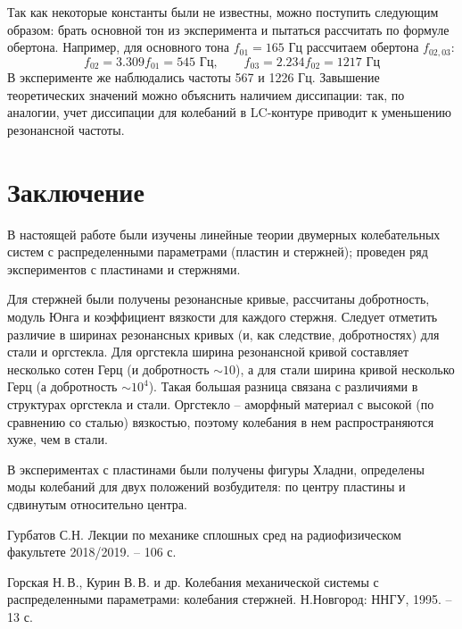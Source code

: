 Так как некоторые константы были не известны, можно поступить следующим образом: брать основной тон из эксперимента и пытаться рассчитать по формуле обертона. Например, для основного тона $f_{01}=165$ Гц рассчитаем обертона $f_{02,03}$:
\begin{equation}
	f_{02} = 3.309 f_{01} = 545 \text{ Гц},\qquad 
	f_{03} = 2.234 f_{02} = 1217 \text{ Гц} 
\end{equation}
В эксперименте же наблюдались частоты 567 и 1226 Гц. Завышение теоретических значений можно объяснить наличием диссипации: так, по аналогии, учет диссипации для колебаний в LC-контуре приводит к уменьшению резонансной частоты.
\newpage
{}
\section*{Заключение}
В настоящей работе были изучены линейные теории двумерных колебательных систем с распределенными параметрами (пластин и стержней); проведен ряд экспериментов с пластинами и стержнями. 

Для стержней были получены резонансные кривые, рассчитаны добротность, модуль Юнга и коэффициент вязкости для каждого стержня. Следует отметить различие в ширинах резонансных кривых (и, как следствие, добротностях) для стали и оргстекла. Для оргстекла ширина резонансной кривой составляет несколько сотен Герц (и добротность $\sim10$), а для стали ширина кривой несколько Герц (а добротность $\sim 10^4$). Такая большая разница связана с различиями в структурах оргстекла и стали. Оргстекло -- аморфный материал с высокой (по сравнению со сталью) вязкостью, поэтому колебания в нем распространяются хуже, чем в стали. 

В экспериментах с пластинами были получены фигуры Хладни, определены моды колебаний для двух положений возбудителя: по центру пластины и сдвинутым относительно центра.

\begin{thebibliography}{}
   Гурбатов С.Н. Лекции по механике сплошных сред на радиофизическом факультете 2018/2019. -- 106 с.
  
   Горская Н.\,В., Курин В.\,В. и др. Колебания механической системы с распределенными параметрами: колебания стержней. Н.Новгород: ННГУ, 1995. -- 13 с.
  
\end{thebibliography}


